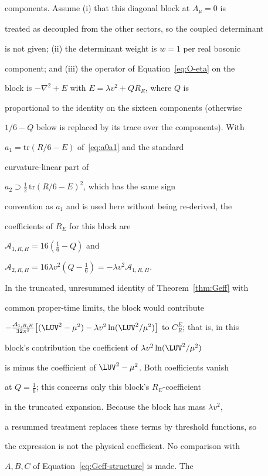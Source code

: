 components.  Assume (i) that this diagonal block at \(A_\mu=0\) is

treated as decoupled from the other sectors, so the coupled determinant

is not given; (ii) the determinant weight is \(w=1\) per real bosonic

component; and (iii) the operator of Equation~\eqref{eq:O-eta} on the

block is \(-\nabla^2+E\) with \(E=\lambda v^2+QR_E\), where \(Q\) is

proportional to the identity on the sixteen components (otherwise

\(1/6-Q\) below is replaced by its trace over the components).  With

\(a_1=\mathrm{tr}(R/6-E)\) of~\eqref{eq:a0a1} and the standard

curvature-linear part of

\(a_2\supset\tfrac12\,\mathrm{tr}(R/6-E)^2\), which has the same sign

convention as \(a_1\) and is used here without being re-derived, the

coefficients of \(R_E\) for this block are

\(\mathcal A_{1,R,H}=16(\tfrac16-Q)\) and

\(\mathcal A_{2,R,H}=16\lambda v^2(Q-\tfrac16)=-\lambda v^2\mathcal A_{1,R,H}\).

In the truncated, unresummed identity of Theorem~\ref{thm:Geff} with

common proper-time limits, the block would contribute

\(-\frac{\mathcal A_{1,R,H}}{32\pi^2}\bigl[(\LUV^2-\mu^2)

-\lambda v^2\ln(\LUV^2/\mu^2)\bigr]\) to \(C_R^E\); that is, in this

block's contribution the coefficient of \(\lambda v^2\ln(\LUV^2/\mu^2)\)

is minus the coefficient of \(\LUV^2-\mu^2\).  Both coefficients vanish

at \(Q=\tfrac16\); this concerns only this block's \(R_E\)-coefficient

in the truncated expansion.  Because the block has mass \(\lambda v^2\),

a resummed treatment replaces these terms by threshold functions, so

the expression is not the physical coefficient.  No comparison with

\(A,B,C\) of Equation~\eqref{eq:Geff-structure} is made.  The

